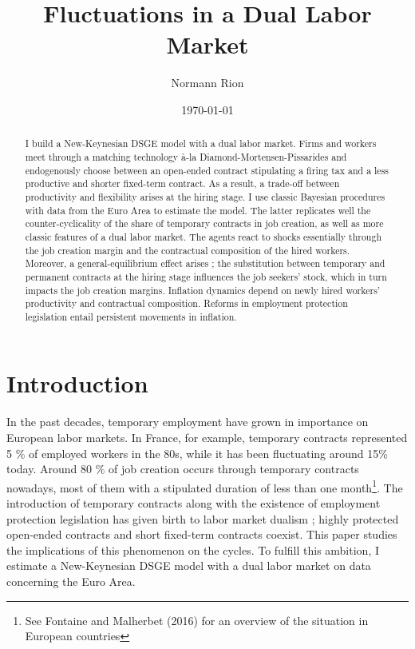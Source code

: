 \documentclass[a4paper]{article}
\title{Fluctuations in a Dual Labor Market}
\author{Normann Rion}
\date{\today}
\begin{document}
\maketitle

\begin{abstract}
I build a New-Keynesian DSGE model with a dual labor market. Firms and workers meet through a matching technology à-la Diamond-Mortensen-Pissarides and endogenously choose between an open-ended contract stipulating a firing tax and a less productive and shorter fixed-term contract. As a result, a trade-off between productivity and flexibility arises at the hiring stage. I use classic Bayesian procedures with data from the Euro Area to estimate the model. The latter replicates well the counter-cyclicality of the share of temporary contracts in job creation, as well as more classic features of a dual labor market. The agents react to shocks essentially through the job creation margin and the contractual composition of the hired workers. Moreover, a general-equilibrium effect arises ; the substitution between temporary and permanent contracts at the hiring stage influences the job seekers' stock, which in turn impacts the job creation margins. Inflation dynamics depend on newly hired workers' productivity and contractual composition. Reforms in employment protection legislation entail persistent movements in inflation.
\end{abstract}

\section{Introduction}

In the past decades, temporary employment have grown in importance on European labor markets. In France, for example, temporary contracts represented 5 \% of employed workers in the 80s, while it has been fluctuating around 15\% today. Around 80 \% of job creation occurs through temporary contracts nowadays, most of them with a stipulated duration of less than one month\footnote{See Fontaine and Malherbet (2016) \cite{fontaine2016cdd} for an overview of the situation in European countries}. The introduction of temporary contracts along with the existence of employment protection legislation has given birth to labor market dualism ; highly protected open-ended contracts and short fixed-term contracts coexist. This paper studies the implications of this phenomenon on the cycles. To fulfill this ambition, I estimate a New-Keynesian DSGE model with a dual labor market on data concerning the Euro Area.
\end{document}

